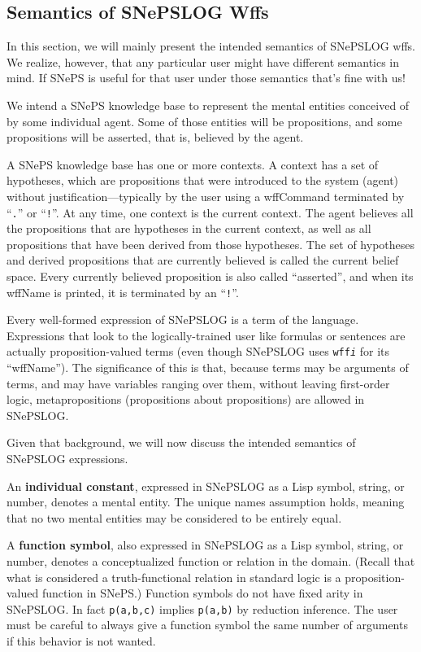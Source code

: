 \documentclass{book}
\begin{document}
\subsection{Semantics of SNePSLOG Wffs}
In this section, we will mainly present the intended semantics of
SNePSLOG wffs.  We realize, however, that any particular user might
have different semantics in mind.  If SNePS is useful for that user
under those semantics that's fine with us!

We intend a SNePS knowledge base to represent the mental entities
conceived of by some individual agent.  Some of those entities will be
propositions, and some propositions will be asserted, that is,
believed by the agent.

A SNePS knowledge base has one or more contexts.  A context has a set
of hypotheses, which are propositions that were introduced to the
system (agent) without justification---typically by the user using a
wffCommand terminated by ``\texttt{.}'' or ``\texttt{!}''.  At any
time, one context is the current context.  The agent believes all the
propositions that are hypotheses in the current context, as well as
all propositions that have been derived from those hypotheses.  The
set of hypotheses and derived propositions that are currently believed
is called the current belief space.  Every currently believed
proposition is also called ``asserted'', and when its wffName is
printed, it is terminated by an ``\texttt{!}''.

Every well-formed expression of SNePSLOG is a term of the language.
Expressions that look to the logically-trained user like formulas or
sentences are actually proposition-valued terms (even though SNePSLOG
uses \texttt{wff\textit{i}} for its ``wffName'').  The significance of
this is that, because terms may be arguments of terms, and may have
variables ranging over them, without leaving first-order logic,
metapropositions (propositions about propositions) are allowed in
SNePSLOG.

Given that background, we will now discuss the intended semantics of
SNePSLOG expressions.

An \textbf{individual constant}, expressed in SNePSLOG as a Lisp
symbol, string, or number, denotes a mental entity.  The unique names
assumption holds, meaning that no two mental entities may be
considered to be entirely equal.

A \textbf{function symbol}, also expressed in SNePSLOG as a Lisp
symbol, string, or number, denotes a conceptualized function or
relation in the domain.  (Recall that what is considered a
truth-functional relation in standard logic is a proposition-valued
function in SNePS.)  Function symbols do not have fixed arity in
SNePSLOG. In fact \texttt{p(a,b,c)} implies \texttt{p(a,b)} by
reduction inference.  The user must be careful to always give a
function symbol the same number of arguments if this behavior is not
wanted.
\end{document}
